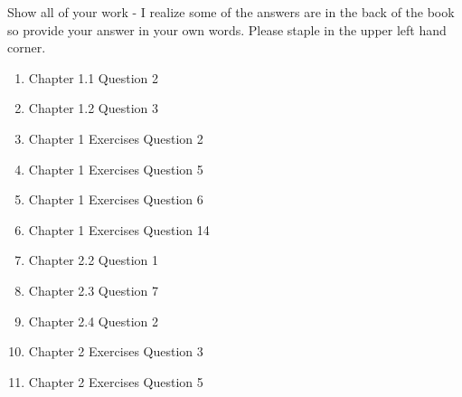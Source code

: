 \documentclass[10pt]{article}
\begin{document}
\pagestyle{fancy}
Show all of your work - I realize some of the answers are in the back of the book so provide your answer in your own words. Please staple in the upper left hand corner.

\begin{enumerate}


\item Chapter 1.1 Question 2
\item Chapter 1.2 Question 3
\item Chapter 1 Exercises Question 2
\item Chapter 1 Exercises Question 5
\item Chapter 1 Exercises Question 6
\item Chapter 1 Exercises Question 14
\item Chapter 2.2 Question 1
\item Chapter 2.3 Question 7
\item Chapter 2.4 Question 2
\item Chapter 2 Exercises Question 3
\item Chapter 2 Exercises Question 5

\end{enumerate} %
\end{document}
